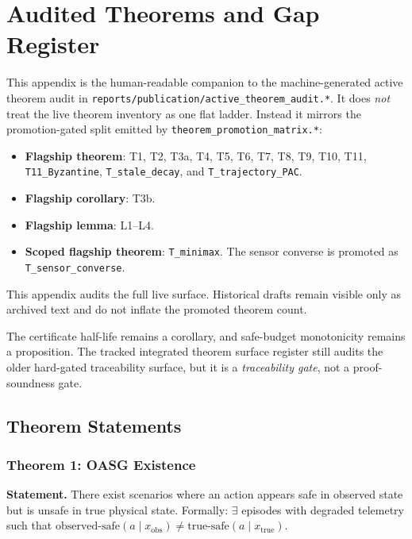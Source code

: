 \chapter{Audited Theorems and Gap Register}
\label{app:verified-theorems-gap-audit}
\begingroup
\footnotesize
\sloppy

This appendix is the human-readable companion to the machine-generated
active theorem audit in \texttt{reports/publication/active\_theorem\_audit.*}.
It does \emph{not} treat the live theorem inventory as one flat ladder.
Instead it mirrors the promotion-gated split emitted by
\texttt{theorem\_promotion\_matrix.*}:
\begin{itemize}
  \item \textbf{Flagship theorem}: T1, T2, T3a, T4, T5, T6, T7, T8, T9, T10,
  T11, \texttt{T11\_Byzantine}, \texttt{T\_stale\_decay}, and
  \texttt{T\_trajectory\_PAC}.
  \item \textbf{Flagship corollary}: T3b.
  \item \textbf{Flagship lemma}: L1--L4.
  \item \textbf{Scoped flagship theorem}: \texttt{T\_minimax}.  The sensor
  converse is promoted as \texttt{T\_sensor\_converse}.
\end{itemize}
This appendix audits the full live surface.  Historical drafts remain visible
only as archived text and do not inflate the promoted theorem count.

The certificate half-life remains a corollary, and safe-budget monotonicity
remains a proposition. The tracked integrated theorem surface register still
audits the older hard-gated traceability surface, but it is a
\emph{traceability gate}, not a proof-soundness gate.

\section{Theorem Statements}

\subsection{Theorem 1: OASG Existence}
\label{sec:thm-oasg}

\textbf{Statement.} There exist scenarios where an action appears safe in observed state but is unsafe in true physical state. Formally: $\exists$ episodes with degraded telemetry such that $\text{observed-safe}(a \mid x_{\text{obs}}) \neq \text{true-safe}(a \mid x_{\text{true}})$.

